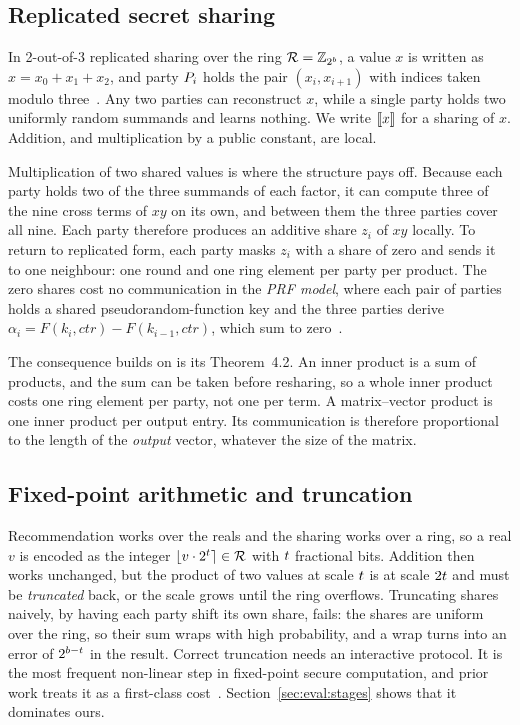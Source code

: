 \subsection{Replicated secret sharing}
\label{sec:background:rss}

In 2-out-of-3 replicated sharing over the ring $\mathcal{R} = \mathbb{Z}_{2^{b}}$, a value
$x$ is written as $x = x_0 + x_1 + x_2$, and party $P_{i}$ holds the pair
$(x_i, x_{i+1})$ with indices taken modulo three~\cite{araki2016}. Any two parties
can reconstruct $x$, while a single party holds two uniformly random summands and
learns nothing. We write $\llbracket x \rrbracket$ for a sharing of $x$. Addition, and
multiplication by a public constant, are local.

Multiplication of two shared values is where the structure pays off. Because
each party holds two of the three summands of each factor, it can compute three
of the nine cross terms of $xy$ on its own, and between them the three parties
cover all nine. Each party therefore produces an additive share $z_i$ of $xy$
locally. To return to replicated form, each party masks $z_i$ with a share of
zero and sends it to one neighbour: one round and one ring element per party per
product. The zero shares cost no communication in the \emph{PRF model}, where
each pair of parties holds a shared pseudorandom-function key and the three
parties derive $\alpha_i = F(k_i, \mathit{ctr}) - F(k_{i-1}, \mathit{ctr})$,
which sum to zero~\cite{araki2016}.

The consequence \nudgeplain{} builds on is its Theorem~4.2. An inner product is a
sum of products, and the sum can be taken before resharing, so a whole inner
product costs one ring element per party, not one per term. A matrix--vector
product is one inner product per output entry. Its communication is therefore
proportional to the length of the \emph{output} vector, whatever the size of the
matrix.

\subsection{Fixed-point arithmetic and truncation}
\label{sec:background:fixed}

Recommendation works over the reals and the sharing works over a ring, so a real
$v$ is encoded as the integer $\lfloor v \cdot 2^{t} \rceil \in \mathcal{R}$
with $t$ fractional bits. Addition then works unchanged, but the product
of two values at scale $t$ is at scale $2t$ and must be
\emph{truncated} back, or the scale grows until the ring overflows. Truncating
shares naively, by having each party shift its own share, fails: the shares are
uniform over the ring, so their sum wraps with high probability, and a wrap turns
into an error of $2^{b - t}$ in the result. Correct truncation needs
an interactive protocol. It is the most frequent non-linear step in fixed-point
secure computation, and prior work treats it as a first-class
cost~\cite{secureml2017,escudero2020}. Section~\ref{sec:eval:stages} shows that
it dominates ours.

